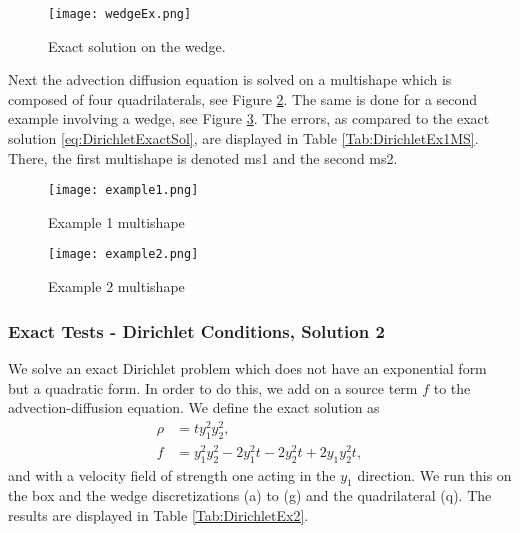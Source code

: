 \begin{figure}[h]
	\centering
	\texttt{[image: wedgeEx.png]}
	\caption{Exact solution on the wedge.} 
	\label{F5}
\end{figure}

Next the advection diffusion equation is solved on a multishape which is composed of four quadrilaterals, see Figure \ref{F6}.  The same is done for a second example involving a wedge, see Figure \ref{F7}.  The errors, as compared to the exact solution \eqref{eq:DirichletExactSol}, are displayed in Table \ref{Tab:DirichletEx1MS}. There, the first multishape is denoted ms1 and the second ms2.
\begin{figure}[h]
	\centering
	\texttt{[image: example1.png]}
	\caption{Example 1 multishape} 
	\label{F6}
\end{figure}


\begin{figure}[h]
	\centering
	\texttt{[image: example2.png]}
	\caption{Example 2 multishape} 
	\label{F7}
\end{figure}




\subsubsection*{Exact Tests - Dirichlet Conditions, Solution 2}

We solve an exact Dirichlet problem which does not have an exponential form but a quadratic form. In order to do this, we add on a source term $f$ to the advection-diffusion equation.
We define the exact solution as
\begin{align*}
	\rho &= t y_1^2 y_2^2,\\
	f &= y_1^2 y_2^2 - 2 y_1^2 t - 2 y_2^2 t + 2 y_1 y_2^2 t,
\end{align*}
and with a velocity field of strength one acting in the $y_1$ direction.
We run this on the box and the wedge discretizations (a) to (g) and the quadrilateral (q). The results are displayed in Table \ref{Tab:DirichletEx2}.





